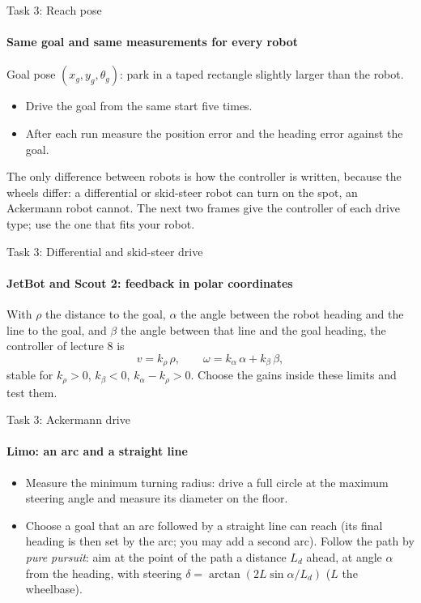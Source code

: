 \documentclass[aspectratio=169]{beamer}
\begin{document}
\begin{frame}[t]{Task 3: Reach pose}
\framesubtitle{Same goal and same measurements for every robot}
    Goal pose $(x_g, y_g, \theta_g)$: park in a taped rectangle slightly larger than the robot.
    \begin{itemize}
        \item Drive the goal from the same start five times.
        \item After each run measure the position error and the heading error against the goal.
    \end{itemize}
    \medskip

    The only difference between robots is how the controller is written, because the wheels
    differ: a differential or skid-steer robot can turn on the spot, an Ackermann robot cannot.
    The next two frames give the controller of each drive type; use the one that fits your robot.
\end{frame}

\begin{frame}[t]{Task 3: Differential and skid-steer drive}
\framesubtitle{JetBot and Scout 2: feedback in polar coordinates}
    With $\rho$ the distance to the goal, $\alpha$ the angle between the robot heading and the
    line to the goal, and $\beta$ the angle between that line and the goal heading, the
    controller of lecture 8 is
    \[
        v = k_\rho\,\rho,\qquad \omega = k_\alpha\,\alpha + k_\beta\,\beta,
    \]
    stable for $k_\rho>0$, $k_\beta<0$, $k_\alpha-k_\rho>0$. Choose the gains inside these
    limits and test them.
\end{frame}

\begin{frame}[t]{Task 3: Ackermann drive}
\framesubtitle{Limo: an arc and a straight line}
    \begin{itemize}
        \item Measure the minimum turning radius: drive a full circle at the maximum steering
              angle and measure its diameter on the floor.
        \item Choose a goal that an arc followed by a straight line can reach (its final heading is
              then set by the arc; you may add a second arc). Follow the path by
              \emph{pure pursuit}: aim at the point of the path a distance $L_d$ ahead, at angle
              $\alpha$ from the heading, with steering $\delta=\arctan(2L\sin\alpha/L_d)$
              ($L$ the wheelbase).
    \end{itemize}
\end{frame}
\end{document}
